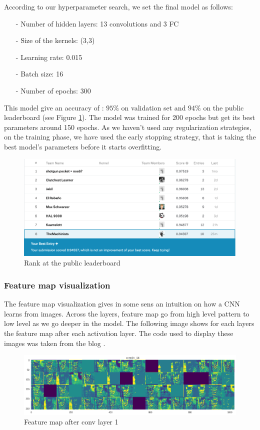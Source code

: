 \documentclass[a4paper]{article}
\begin{document}
According to our hyperparameter search, we set the final model as follows:
\begin{itemize}
\setlength\itemsep{0em}
\item[-]Number of hidden layers: 13 convolutions and 3 FC
\item[-]Size of the kernels: (3,3)
\item[-]Learning rate: 0.015
\item[-]Batch size: 16
\item[-]Number of epochs: 300
\end{itemize}
%
This model give an accuracy of : $95\%$ on validation set and $94\%$ on the public leaderboard (see Figure \ref{fig:kaggle}). The model was trained for 200 epochs but get its best parameters around 150 epochs.
%
As we haven't used any regularization strategies, on the training phase, we have used the early stopping strategy, that is taking the best model's parameters before it starts overfitting.

\begin{figure}[h!]
	\centering
	\includegraphics[scale=.4]{kaggle.png}
	\caption{Rank at the public leaderboard}
	\label{fig:kaggle}
\end{figure}

\subsubsection{Feature map visualization}
The feature map visualization gives in some sens an intuition on how a CNN learns from images. Across the layers, feature map go from high level pattern to low level as we go deeper in the model. The following image shows for each layers the feature map after each activation layer. The code used to display these images was taken from the blog \cite{featuremap}.

\begin{figure}[h!]
	\centering
	\includegraphics[scale=.3]{fp1.png}
	\caption{Feature map after conv layer 1}
	\label{fig:fp1}
\end{figure}
\end{document}

